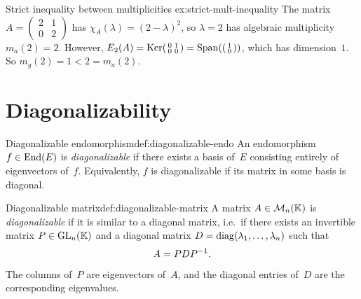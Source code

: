 \begin{example}{Strict inequality between multiplicities}%
{ex:strict-mult-inequality}
The matrix $A = \begin{pmatrix} 2 & 1 \\ 0 & 2 \end{pmatrix}$ has
$\chi_A(\lambda) = (2-\lambda)^2$, so $\lambda = 2$ has algebraic
multiplicity $m_a(2) = 2$.  However,
$E_2(A) = \operatorname{Ker}\begin{psmallmatrix} 0 & 1 \\ 0 & 0 \end{psmallmatrix}
= \operatorname{Span}\!\left(\begin{psmallmatrix} 1 \\ 0 \end{psmallmatrix}\right)$,
which has dimension~$1$.  So $m_g(2) = 1 < 2 = m_a(2)$.
\end{example}


\section{Diagonalizability}\label{sec:diagonalizability}

\begin{definition}{Diagonalizable endomorphism}{def:diagonalizable-endo}
An endomorphism $f\in\operatorname{End}(E)$ is \emph{diagonalizable} if there
exists a basis of~$E$ consisting entirely of eigenvectors of~$f$.
Equivalently, $f$ is diagonalizable if its matrix in some basis is
diagonal.
\end{definition}

\begin{definition}{Diagonalizable matrix}{def:diagonalizable-matrix}
A matrix $A\in\mathcal{M}_n({\mathbb{K}})$ is \emph{diagonalizable} if it is similar
to a diagonal matrix, i.e.\ if there exists an invertible matrix
$P\in\operatorname{GL}_n({\mathbb{K}})$ and a diagonal matrix
$D = \operatorname{diag}(\lambda_1,\ldots,\lambda_n)$ such that
\[
  A = P D {P}^{-1}.
\]
The columns of~$P$ are eigenvectors of~$A$, and the diagonal entries
of~$D$ are the corresponding eigenvalues.
\end{definition}

